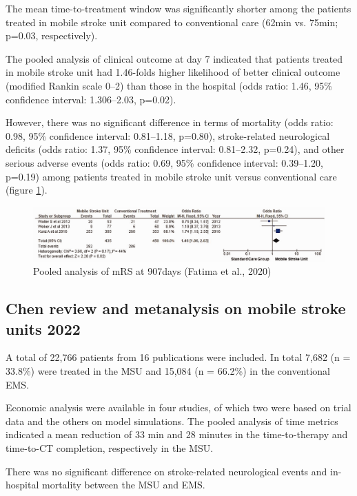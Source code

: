 The mean time-to-treatment window was significantly shorter among the patients treated in mobile stroke unit compared to conventional care (62min vs. 75min; p=0.03, respectively).

The pooled analysis of clinical outcome at day 7 indicated that patients treated in mobile stroke unit had 1.46-folds higher likelihood of better clinical outcome (modified Rankin scale 0–2) than those in the hospital (odds ratio: 1.46, 95\% confidence interval: 1.306–2.03, p=0.02).

However, there was no significant difference in terms of mortality (odds ratio: 0.98, 95\% confidence interval: 0.81–1.18, p=0.80), stroke-related neurological deficits (odds ratio: 1.37, 95\% confidence interval: 0.81–2.32, p=0.24), and other serious adverse events (odds ratio: 0.69, 95\% confidence interval: 0.39–1.20, p=0.19) among patients treated in mobile stroke unit versus conventional care (figure \ref{fig:background_fatima_fig_5}).

\begin{figure}
    \centering
    \includegraphics[width=0.5\linewidth]{images_background/fatima_fig_5}
    \caption{Pooled analysis of mRS at 907days (Fatima et al., 2020)}
    \label{fig:background_fatima_fig_5}
\end{figure}


\subsection{Chen review and metanalysis on mobile stroke units 2022 \cite{chen_systematic_2022}}

A total of 22,766 patients from 16 publications were included. In total 7,682 (n = 33.8\%) were treated in the MSU and 15,084 (n = 66.2\%) in the conventional EMS.

Economic analysis were available in four studies, of which two were based on trial data and the others on model simulations. The pooled analysis of time metrics indicated a mean reduction of 33 min and 28 minutes in the time-to-therapy and time-to-CT completion, respectively in the MSU.

There was no significant difference on stroke-related neurological events and in-hospital mortality between the MSU and EMS.

